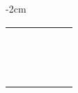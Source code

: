 \begin{center}
\begin{adjustwidth}{-2cm}{}
\begin{tabular}{|c c c c c c|}
             &  &  &  &  &  \\
             &  &  &  &  &  \\
             &  &  &  &  &  \\
             &  &  &  &  &  \\
             &  &  &  &  &  \\
             &  &  &  &  &  \\
             &  &  &  &  &  \\
             &  &  &  &  &  \\
             &  &  &  &  &  \\
             &  &  &  &  &  \\
             &  &  &  &  &  \\
             &  &  &  &  &  \\
             &  &  &  &  &  \\
             &  &  &  &  &  \\
            \hline
        \end{tabular}
    \end{adjustwidth}
\end{center}

